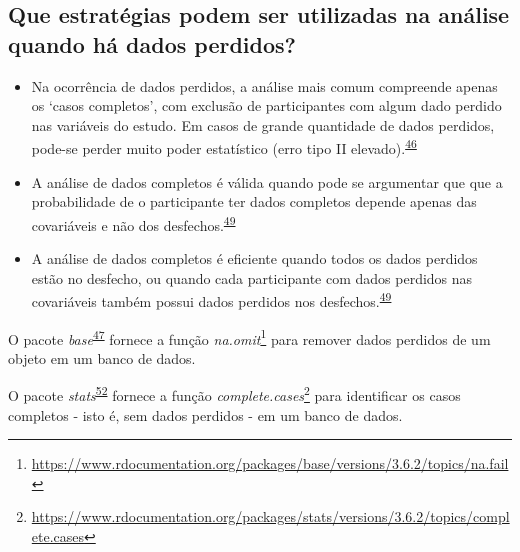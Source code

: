 \documentclass[
  a4paper,
]{book}
\renewcommand{\href}[2]{#2\footnote{\url{#1}}}
\newenvironment{infobox}[1]
  {
  \begin{itemize}
  \renewcommand{\labelitemi}{
    \raisebox{-.7\height}[0pt][0pt]{
      {\setkeys{Gin}{width=3em,keepaspectratio}
        \texttt{[image: \#1]}}
    }
  }
  \setlength{\fboxsep}{1em}
  \begin{blackbox}
  \item
  }
  {
  \end{blackbox}
  \end{itemize}
  }
\begin{document}
\hypertarget{que-estratuxe9gias-podem-ser-utilizadas-na-anuxe1lise-quando-huxe1-dados-perdidos}{%
\subsection{Que estratégias podem ser utilizadas na análise quando há dados perdidos?}\label{que-estratuxe9gias-podem-ser-utilizadas-na-anuxe1lise-quando-huxe1-dados-perdidos}}

\begin{itemize}
\item
  Na ocorrência de dados perdidos, a análise mais comum compreende apenas os `casos completos', com exclusão de participantes com algum dado perdido nas variáveis do estudo. Em casos de grande quantidade de dados perdidos, pode-se perder muito poder estatístico (erro tipo II elevado).\textsuperscript{\protect\hyperlink{ref-Altman2007}{46}}
\item
  A análise de dados completos é válida quando pode se argumentar que que a probabilidade de o participante ter dados completos depende apenas das covariáveis e não dos desfechos.\textsuperscript{\protect\hyperlink{ref-carpenter2021}{49}}
\item
  A análise de dados completos é eficiente quando todos os dados perdidos estão no desfecho, ou quando cada participante com dados perdidos nas covariáveis também possui dados perdidos nos desfechos.\textsuperscript{\protect\hyperlink{ref-carpenter2021}{49}}
\end{itemize}

\begin{infobox}{images/Rlogo}
O pacote \emph{base}\textsuperscript{\protect\hyperlink{ref-base-2}{47}} fornece a função \href{https://www.rdocumentation.org/packages/base/versions/3.6.2/topics/na.fail}{\emph{na.omit}} para remover dados perdidos de um objeto em um banco de dados.

\end{infobox}

\begin{infobox}{images/Rlogo}
O pacote \emph{stats}\textsuperscript{\protect\hyperlink{ref-stats}{52}} fornece a função \href{https://www.rdocumentation.org/packages/stats/versions/3.6.2/topics/complete.cases}{\emph{complete.cases}} para identificar os casos completos - isto é, sem dados perdidos - em um banco de dados.

\end{infobox}
\end{document}
